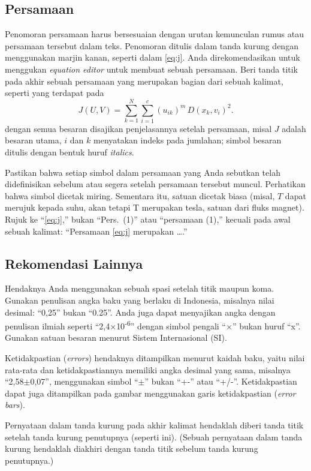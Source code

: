 \documentclass{its-jurnal}
\begin{document}
\subsection{Persamaan}
Penomoran persamaan harus bersesuaian dengan urutan kemunculan rumus atau persamaan tersebut dalam teks. Penomoran ditulis dalam tanda kurung dengan menggunakan marjin kanan, seperti dalam \eqref{eq:j}. Anda direkomendasikan untuk menggukan \textit{equation editor} untuk membuat sebuah persamaan. Beri tanda titik pada akhir sebuah persamaan yang merupakan bagian dari sebuah kalimat, seperti yang terdapat pada
\begin{equation}
  J(U,V) = \sum_{k=1}^{N}\sum_{i=1}^{c} (u_{ik})^{m}\, D(x_{k}, v_{i})^{2}.
  \label{eq:j}
\end{equation}
dengan semua besaran disajikan penjelasannya setelah persamaan, misal $J$ adalah besaran utama, $i$ dan $k$ menyatakan indeks pada jumlahan; simbol besaran ditulis dengan bentuk huruf \textit{italics}.

Pastikan bahwa setiap simbol dalam persamaan yang Anda sebutkan telah didefinisikan sebelum atau segera setelah persamaan tersebut muncul. Perhatikan bahwa simbol dicetak miring. Sementara itu, satuan dicetak biasa (misal, $T$ dapat merujuk kepada suhu, akan tetapi T merupakan tesla, satuan dari fluks magnet). Rujuk ke ``\eqref{eq:j},'' bukan ``Pers.~(1)'' atau ``persamaan (1),'' kecuali pada awal sebuah kalimat: ``Persamaan \eqref{eq:j} merupakan \ldots.''

\subsection{Rekomendasi Lainnya}
Hendaknya Anda menggunakan sebuah spasi setelah titik maupun koma. Gunakan penulisan angka baku yang berlaku di Indonesia, misalnya nilai desimal: ``0,25'' bukan ``0.25''. Anda juga dapat menyajikan angka dengan penulisan ilmiah seperti ``2,4$\times$10\textsuperscript{-6}'' dengan simbol pengali ``$\times$'' bukan huruf ``x''. Gunakan satuan besaran menurut Sistem Internasional (SI).

Ketidakpastian (\textit{errors}) hendaknya ditampilkan menurut kaidah baku, yaitu nilai rata-rata dan ketidakpastiannya memiliki angka desimal yang sama, misalnya ``2,58$\pm$0,07'', menggunakan simbol ``$\pm$'' bukan ``+-'' atau ``+/-''. Ketidakpastian dapat juga ditampilkan pada gambar menggunakan garis ketidakpastian (\textit{error bars}).

Pernyataan dalam tanda kurung pada akhir kalimat hendaklah diberi tanda titik setelah tanda kurung penutupnya (seperti ini). (Sebuah pernyataan dalam tanda kurung hendaklah diakhiri dengan tanda titik sebelum tanda kurung penutupnya.)
\end{document}
